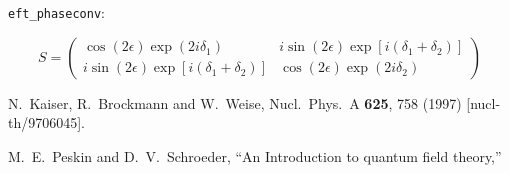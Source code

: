 \documentclass{article}
\begin{document}
\verb;eft_phaseconv;:

\begin{equation}
S= {\left( \begin{array}{cc}
\cos(2\epsilon) \exp(2i\delta_1) & i\sin(2\epsilon)\exp[i(\delta_1 + \delta_2 )]\\
i\sin(2\epsilon)\exp[i(\delta_1 + \delta_2 )] & \cos(2\epsilon) \exp(2i\delta_2)
\end{array} \right)  }
\end{equation}





\begin{thebibliography}{99}

  N.~Kaiser, R.~Brockmann and W.~Weise,
  Nucl.\ Phys.\ A {\bf 625}, 758 (1997)
  [nucl-th/9706045].

  M.~E.~Peskin and D.~V.~Schroeder,
  ``An Introduction to quantum field theory,''

\end{thebibliography}
\end{document}
